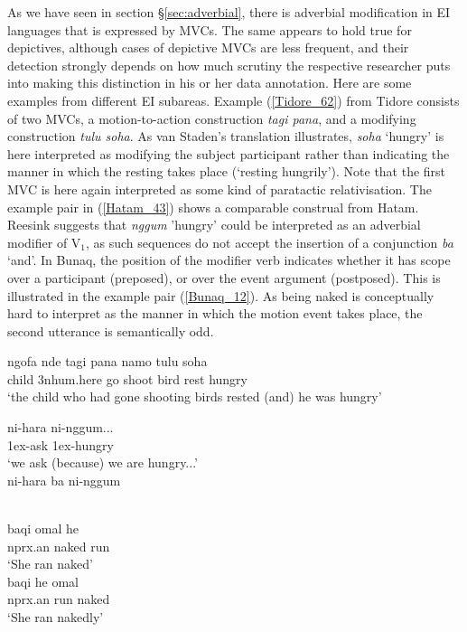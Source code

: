 As we have seen in section §\ref{sec:adverbial}, there is adverbial modification in EI languages that is expressed by MVCs. The same appears to hold true for depictives, although cases of depictive MVCs are less frequent, and their detection strongly depends on how much scrutiny the respective researcher puts into making this distinction in his or her data annotation. Here are some examples from different EI subareas. Example (\ref{Tidore_62}) from Tidore consists of two MVCs, a motion-to-action construction \textit{tagi pana}, and a modifying construction \textit{tulu soha}. As van Staden's translation illustrates, \textit{soha} `hungry' is here interpreted as modifying the subject participant rather than indicating the manner in which the resting takes place (`resting hungrily'). Note that the first MVC is here again interpreted as some kind of paratactic relativisation. The example pair in (\ref{Hatam_43}) shows a comparable construal from Hatam. Reesink suggests that \textit{nggum} 'hungry' could be interpreted as an adverbial modifier of V$_1$, as such sequences do not accept the insertion of a conjunction \textit{ba} `and'. In Bunaq, the position of the modifier verb indicates whether it has scope over a participant (preposed), or over the event argument (postposed). This is illustrated in the example pair (\ref{Bunaq_12}). As being naked is conceptually hard to interpret as the manner in which the motion event takes place, the second utterance is semantically odd.

\ea \label{Tidore_62}
\gll ngofa nde tagi pana namo tulu soha \\
child 3\acs{nhum}.here go shoot bird rest hungry \\
\glft `the child who had gone shooting birds rested (and) he was hungry' \\ 
\z
\xe

\pex \label{Hatam_43}
\a
\gll ni-hara ni-nggum... \\
1\acs{ex}-ask 1\acs{ex}-hungry \\
\glft `we ask (because) we are hungry...' \\ 
\z
\a
\gll *ni-hara ba ni-nggum \\ 
\glft  {}\\ 
\z
\xe

\pex \label{Bunaq_12}
\a
\gll baqi omal he \\
\acs{nprx}.\acs{an} naked run \\
\glft `She ran naked' \\ 
\z
\a
\gll baqi he omal \\ 
\acs{nprx}.\acs{an} run naked \\
\glft `She ran nakedly' \\ 
\z
\xe

